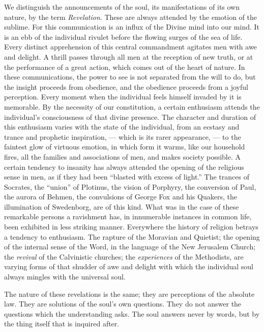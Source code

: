 \documentclass{article}
\begin{document}
We distinguish the announcements of the soul, its manifestations of its own nature, by the term \emph{Revelation}. These are always attended by the emotion of the sublime. For this communication is an influx of the Divine mind into our mind. It is an ebb of the individual rivulet before the flowing surges of the sea of life. Every distinct apprehension of this central commandment agitates men with awe and delight. A thrill passes through all men at the reception of new truth, or at the performance of a great action, which comes out of the heart of nature. In these communications, the power to see is not separated from the will to do, but the insight proceeds from obedience, and the obedience proceeds from a joyful perception. Every moment when the individual feels himself invaded by it is memorable. By the necessity of our constitution, a certain enthusiasm attends the individual's consciousness of that divine presence. The character and duration of this enthusiasm varies with the state of the individual, from an ecstasy and trance and prophetic inspiration, --- which is its rarer appearance, --- to the faintest glow of virtuous emotion, in which form it warms, like our household fires, all the families and associations of men, and makes society possible. A certain tendency to insanity has always attended the opening of the religious sense in men, as if they had been ``blasted with excess of light.'' The trances of Socrates, the ``union'' of Plotinus, the vision of Porphyry, the conversion of Paul, the aurora of Behmen, the convulsions of George Fox and his Quakers, the illumination of Swedenborg, are of this kind. What was in the case of these remarkable persons a ravishment has, in innumerable instances in common life, been exhibited in less striking manner. Everywhere the history of religion betrays a tendency to enthusiasm. The rapture of the Moravian and Quietist; the opening of the internal sense of the Word, in the language of the New Jerusalem Church; the \emph{revival} of the Calvinistic churches; the \emph{experiences} of the Methodists, are varying forms of that shudder of awe and delight with which the individual soul always mingles with the universal soul.

The nature of these revelations is the same; they are perceptions of the absolute law. They are solutions of the soul's own questions. They do not answer the questions which the understanding asks. The soul answers never by words, but by the thing itself that is inquired after.
\end{document}
